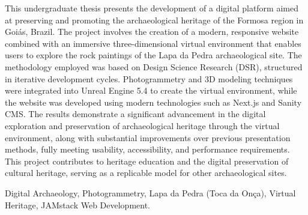 This undergraduate thesis presents the development of a digital platform aimed at preserving and promoting the archaeological heritage of the Formosa region in Goiás, Brazil. The project involves the creation of a modern, responsive website combined with an immersive three-dimensional virtual environment that enables users to explore the rock paintings of the Lapa da Pedra archaeological site. The methodology employed was based on Design Science Research (DSR), structured in iterative development cycles. Photogrammetry and 3D modeling techniques were integrated into Unreal Engine 5.4 to create the virtual environment, while the website was developed using modern technologies such as Next.js and Sanity CMS. The results demonstrate a significant advancement in the digital exploration and preservation of archaeological heritage through the virtual environment, along with substantial improvements over previous presentation methods, fully meeting usability, accessibility, and performance requirements. This project contributes to heritage education and the digital preservation of cultural heritage, serving as a replicable model for other archaeological sites.

\begin{keywords}
Digital Archaeology, Photogrammetry, Lapa da Pedra (Toca da Onça), Virtual Heritage, JAMstack Web Development.
\end{keywords}